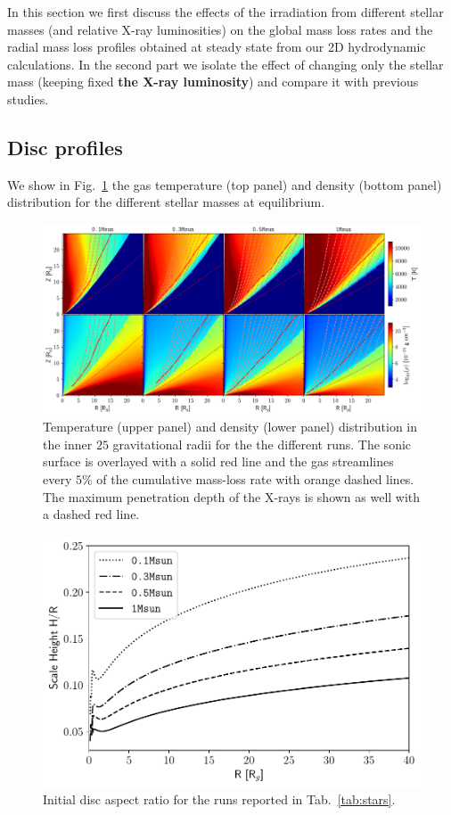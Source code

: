 \documentclass[usenatbib,useAMS,usedcolumn]{mnras}
\begin{document}
In this section we first discuss the effects of the irradiation from different stellar masses (and relative X-ray luminosities) on the global mass loss rates and the radial mass loss profiles obtained at steady state from our 2D hydrodynamic calculations. In the second part we isolate the effect of changing only the stellar mass (keeping fixed \textbf{the X-ray luminosity}) and compare it with previous studies.

\subsection{Disc profiles}
We show in Fig.~\ref{fig:discs} the gas temperature (top panel) and density (bottom panel) distribution for the different stellar masses at equilibrium.
\begin{figure}
    \centering
    \includegraphics[width=\textwidth]{Figure4}
    \caption{Temperature (upper panel) and density (lower panel) distribution in the inner $25$ gravitational radii for the the different runs. The sonic surface is overlayed with a solid red line and the gas streamlines every $5\%$ of the cumulative mass-loss rate with orange dashed lines. The maximum penetration depth of the X-rays is shown as well with a dashed red line. \label{fig:discs}}
\end{figure}
\begin{figure}
    \centering
    \includegraphics[width=\columnwidth]{Figure5}
    \caption{Initial disc aspect ratio for the runs reported in Tab.~\ref{tab:stars}. \label{fig:aspectratio}}
\end{figure}
\end{document}
